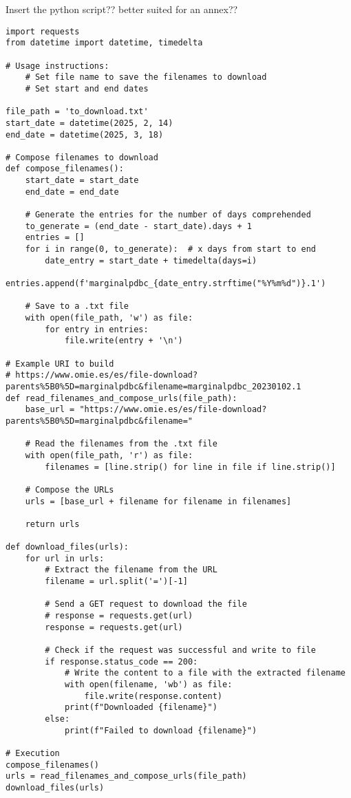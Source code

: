 \documentclass[12pt]{report} %
\begin{document}
Insert the python script?? better suited for an annex??
\begin{lstlisting}
import requests
from datetime import datetime, timedelta

# Usage instructions:
    # Set file name to save the filenames to download
    # Set start and end dates

file_path = 'to_download.txt'
start_date = datetime(2025, 2, 14)
end_date = datetime(2025, 3, 18)

# Compose filenames to download
def compose_filenames():
    start_date = start_date
    end_date = end_date
    
    # Generate the entries for the number of days comprehended
    to_generate = (end_date - start_date).days + 1
    entries = []
    for i in range(0, to_generate):  # x days from start to end
        date_entry = start_date + timedelta(days=i)
        entries.append(f'marginalpdbc_{date_entry.strftime("%Y%m%d")}.1')
    
    # Save to a .txt file
    with open(file_path, 'w') as file:
        for entry in entries:
            file.write(entry + '\n')

# Example URI to build
# https://www.omie.es/es/file-download?parents%5B0%5D=marginalpdbc&filename=marginalpdbc_20230102.1
def read_filenames_and_compose_urls(file_path):
    base_url = "https://www.omie.es/es/file-download?parents%5B0%5D=marginalpdbc&filename="
    
    # Read the filenames from the .txt file
    with open(file_path, 'r') as file:
        filenames = [line.strip() for line in file if line.strip()]
    
    # Compose the URLs
    urls = [base_url + filename for filename in filenames]
    
    return urls

def download_files(urls):
    for url in urls:
        # Extract the filename from the URL
        filename = url.split('=')[-1]
        
        # Send a GET request to download the file
        # response = requests.get(url)
        response = requests.get(url)
        
        # Check if the request was successful and write to file
        if response.status_code == 200:
            # Write the content to a file with the extracted filename
            with open(filename, 'wb') as file:
                file.write(response.content)
            print(f"Downloaded {filename}")
        else:
            print(f"Failed to download {filename}")

# Execution
compose_filenames()
urls = read_filenames_and_compose_urls(file_path)
download_files(urls)
\end{lstlisting}
\end{document}
